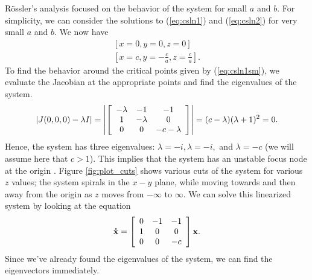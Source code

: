 \documentclass{article}
\begin{document}
R\"{o}ssler's analysis focused on the behavior of the system for small $a$ and $b$. For simplicity, we can consider the solutions to (\ref{eq:csln1}) and (\ref{eq:csln2}) for very small $a$ and $b$. We now have
\begin{gather}
	\left[
	x=0,
	y=0,
	z=0
	\right]\label{eq:csln1sm}\\
	\left[
	x=c,
	y=-\frac{c}{a},
	z=\frac{c}{a}
	\right]\label{eq:csln2sm}.
\end{gather}
To find the behavior around the critical points given by (\ref{eq:csln1sm}), we evaluate the Jacobian at the appropriate points and find the eigenvalues of the system.
\[
	|J(0,0,0)-\lambda I| =
	\left|
	\left[
	\begin{array}{c c c}
		-\lambda & -1       & -1         \\
		1        & -\lambda & 0          \\
		0        & 0        & -c-\lambda
	\end{array}
	\right]
	\right| =
	(c-\lambda)(\lambda + 1)^{2}=0.
\]
Hence, the system has three eigenvalues: $\lambda=-i, \lambda=-i,$ and $\lambda = -c$ (we will assume here that $c > 1$). This implies that the system has an unstable focus node at the origin \cite{equilibria}. Figure \ref{fig:plot_cuts} shows various cuts of the system for various $z$ values; the system spirals in the $x-y$ plane, while moving towards and then away from the origin as $z$ moves from $-\infty$ to $\infty$. We can solve this linearized system by looking at the equation
\[
	\mathbf{\dot{x}} =
	\left[
	\begin{array}{c c c}
		0 & -1 & -1 \\
		1 & 0  & 0  \\
		0 & 0  & -c
	\end{array}
	\right]
	\mathbf{x}.
\]
Since we've already found the eigenvalues of the system, we can find the eigenvectors immediately.
\end{document}
